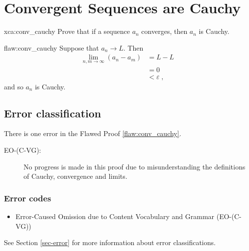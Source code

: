 \section{Convergent Sequences are Cauchy}

\begin{xca}{xca:conv_cauchy}
Prove that if a sequence $a_n$ converges, then $a_n$ is Cauchy.
\end{xca}

\begin{flaw}{flaw:conv_cauchy} %
Suppose that $a_n \rightarrow L.$ Then
\begin{align*}
    \lim_{n,m \rightarrow \infty} (a_n - a_m) &= L - L \\
    &= 0 \\
    &< \varepsilon\;,
\end{align*}
and so $a_n$ is Cauchy.
\end{flaw}

\clearpage
\subsection{Error classification}


There is one error
 in the Flawed Proof \ref{flaw:conv_cauchy}. %


 \begin{description}
 	\item[EO-(C-VG):] No progress is made in this proof due to misunderstanding the definitions of Cauchy, convergence and limits.
 \end{description}


\subsubsection{Error codes}
\begin{itemize}
	\item 	Error-Caused Omission due to Content Vocabulary and Grammar (EO-(C-VG))
\end{itemize}
See Section \ref{sec-error} for more information about error classifications.

